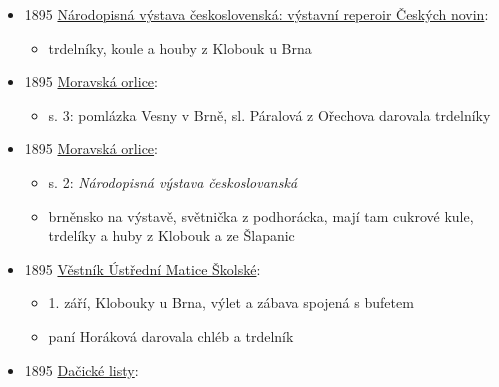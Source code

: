 \begin{itemize}
  \begin{itemize}
  \tightlist
  \item
    Prügelkrapfen = víd. náčepky
  \item
    Ringkuchen = trdelník, koláč
  \item
    Ringelkrapfen = trdelník, vaječník
  \item
    Spiesskrapfen, Spiesskuchen = m. vaječník, trdelník
  \end{itemize}
\item
  1895
  \href{https://ceskadigitalniknihovna.cz/uuid/uuid:67436920-adcf-11ed-9763-5ef3fc9bb22f}{Národopisná
  výstava československá: výstavní reperoir Českých novin}:

  \begin{itemize}
  \tightlist
  \item
    trdelníky, koule a houby z Klobouk u Brna
  \end{itemize}
\item
  1895
  \href{https://ceskadigitalniknihovna.cz/uuid/uuid:2a76016a-32f0-11de-992b-00145e5790ea}{Moravská
  orlice}:

  \begin{itemize}
  \tightlist
  \item
    s. 3: pomlázka Vesny v Brně, sl. Páralová z Ořechova darovala
    trdelníky
  \end{itemize}
\item
  1895
  \href{https://ceskadigitalniknihovna.cz/uuid/uuid:2a7c1c1f-32f0-11de-992b-00145e5790ea}{Moravská
  orlice}:

  \begin{itemize}
  \tightlist
  \item
    s. 2: \emph{Národopisná výstava českoslovanská}
  \item
    brněnsko na výstavě, světnička z podhorácka, mají tam cukrové kule,
    trdelíky a huby z Klobouk a ze Šlapanic
  \end{itemize}
\item
  1895
  \href{https://ceskadigitalniknihovna.cz/uuid/uuid:f6731d10-a2e1-11e7-a093-005056825209}{Věstník
  Ústřední Matice Školské}:

  \begin{itemize}
  \tightlist
  \item
    1. září, Klobouky u Brna, výlet a zábava spojená s bufetem
  \item
    paní Horáková darovala chléb a trdelník
  \end{itemize}
\item
  1895
  \href{https://www.digitalniknihovna.cz/vkol/uuid/uuid:a7f4aea1-a2cd-4d9f-a1fa-b43aa3c25dff}{Dačické
  listy}:


\end{itemize}
